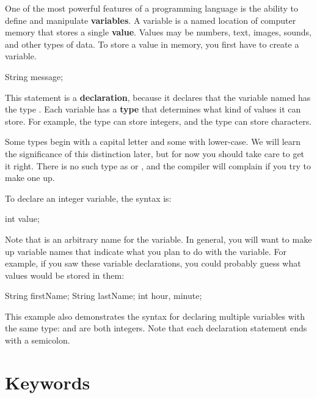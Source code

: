 One of the most powerful features of a programming language is the ability to define and manipulate {\bf variables}.
A variable is a named location of computer memory that stores a single {\bf value}.
Values may be numbers, text, images, sounds, and other types of data.
To store a value in memory, you first have to create a variable.

\begin{code}
    String message;
\end{code}


This statement is a {\bf declaration}, because it declares that the variable named  has the type .
Each variable has a {\bf type} that determines what kind of values it can store.
For example, the  type can store integers, and the  type can store characters.

Some types begin with a capital letter and some with lower-case.
We will learn the significance of this distinction later, but for now you should take care to get it right.
There is no such type as  or , and the compiler will complain if you try to make one up.

To declare an integer variable, the syntax is:

\begin{code}
    int value;
\end{code}

Note that  is an arbitrary name for the variable.
In general, you will want to make up variable names that indicate what you plan to do with the variable.
For example, if you saw these variable declarations, you could probably guess what values would be stored in them:

\begin{code}
    String firstName;
    String lastName;
    int hour, minute;
\end{code}

This example also demonstrates the syntax for declaring multiple variables with the same type:  and  are both integers.
Note that each declaration statement ends with a semicolon.


\section{Keywords}

